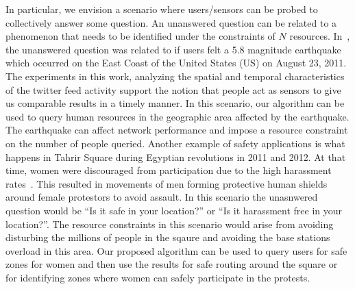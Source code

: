 \documentclass{acm_proc_article-sp}
\begin{document}
In particular, we envision a scenario where users/sensors can be probed to collectively answer some question. An unanswered question can be related to a phenomenon that needs to be identified under the constraints of $N$ resources. In~\cite{crooks2013earthquake}, the unanswered question was related to if users felt a 5.8 magnitude earthquake which occurred on the East Coast of the United States (US) on August 23, 2011. The experiments in this work, analyzing the spatial and temporal characteristics of the twitter feed activity support the notion that people act as sensors to give us comparable results in a timely manner. In this scenario, our algorithm can be used to query human resources in the geographic area affected by the earthquake. The earthquake can affect network performance and impose a resource constraint on the number of people queried. Another example of safety applications is what happens in Tahrir Square during Egyptian revolutions in 2011 and 2012. At that time, women were discouraged from participation due to the high harassment rates~\cite{guardianSH}. This resulted in movements of men forming protective human shields~\cite{worldPostHS} around female protestors to avoid assault. In this scenario the unasnwered question would be ``Is it safe in your location?'' or ``Is it harassment free in your location?''. The resource constraints in this scenario would arise from avoiding disturbing the millions of people in the sqaure and avoiding the base stations overload in this area.  
Our proposed algorithm can be used to query users for safe zones for women and then use the results for safe routing around the square or for identifying zones where women can safely participate in the protests. \par
\end{document}
